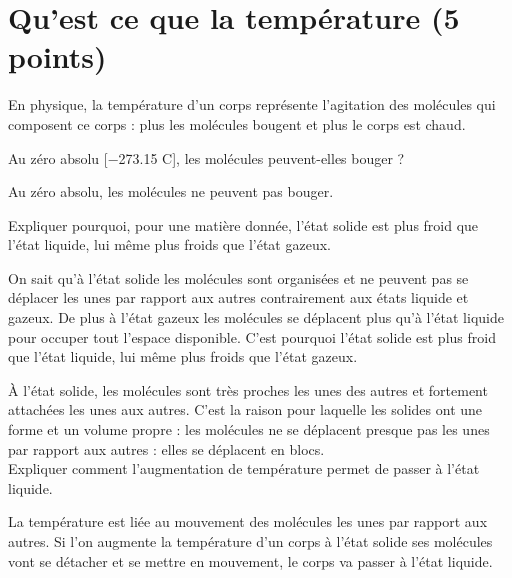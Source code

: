 \section{Qu'est ce que la température (5 points) }\label{ex:temperture}

En physique, la température d'un corps représente l'agitation des molécules qui composent ce corps : plus les molécules bougent et plus le corps est chaud.

\begin{questions}
	\question[1] Au zéro absolu [\num{-273.15} \degree C], les molécules peuvent-elles bouger ?
	\begin{solution}
		Au zéro absolu, les molécules ne peuvent pas bouger.
	\end{solution}
	
	\question[2] Expliquer pourquoi, pour une matière donnée, l'état solide est plus froid que l'état liquide, lui même plus froids que l'état gazeux.
	\begin{solution}
		On sait qu'à l'état solide les molécules sont organisées et ne peuvent pas se déplacer les unes par rapport aux autres contrairement aux états liquide et gazeux. De plus à l'état gazeux les molécules se déplacent plus qu'à l'état liquide pour occuper tout l'espace disponible. C'est pourquoi l'état solide est plus froid que l'état liquide, lui même plus froids que l'état gazeux.
	\end{solution}
	
	\question[2] À l'état solide, les molécules sont très proches les unes des autres et fortement attachées les unes aux autres. C'est la raison pour laquelle les solides ont une forme et un volume propre : les molécules ne se déplacent presque pas les unes par rapport aux autres : elles se déplacent en blocs. \\ Expliquer comment l'augmentation de température permet de passer à l'état liquide.
	\begin{solution}
		La température est liée au mouvement des molécules les unes par rapport aux autres. Si l'on augmente la température d'un corps à l'état solide ses molécules vont se détacher et se mettre en mouvement, le corps va passer à l'état liquide.
	\end{solution}
	
\end{questions}